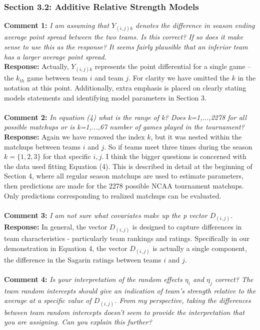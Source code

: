 \documentclass[11pt]{article} %
\begin{document}
\subsubsection*{Section 3.2: Additive Relative Strength Models}
{\bf Comment 1:} \emph{I am assuming that $Y_{(i,j)k}$ denotes the difference in season ending average point spread between the two teams. Is this correct? If so does it make sense to use this as the response? It seems fairly plausible that an inferior team has a larger average point spread.\\}
{\bf Response:} Actually, $Y_{(i,j)k}$ represents the point differential for a single game -- the $k_{th}$ game between team $i$ and team $j$. For clarity we have omitted the $k$ in the notation at this point. Additionally, extra emphasis is placed on clearly stating models statements and identifying model parameters in Section 3.\\
\\
{\bf Comment 2:} \emph{In equation (4) what is the range of k? Does k=1,...,2278 for all possible matchups or is k=1,...,67 number of games played in the tournament?\\}
{\bf Response:} Again we have removed the index $k$, but it was nested within the matchups between teams $i$ and $j$. So if teams meet three times during the season $k = \{1,2,3\}$ for that specific $i,j$. I think the bigger questions is concerned with the data used fitting Equation (4). This is described in detail at the beginning of Section 4, where all regular season matchups are used to estimate parameters, then predictions are made for the 2278 possible NCAA tournament matchups. Only predictions corresponding to realized matchups can be evaluated.\\
\\
{\bf Comment 3:} \emph{I am not sure what covariates make up the p vector $D_{(i,j)}$.\\}
{\bf Response:} In general, the vector $D_{(i,j)}$ is designed to capture differences in team characteristics - particularly team rankings and ratings. Specifically in our demonstration in Equation 4, the vector $D_{(i,j)}$ is actually a  single component, the difference in the Sagarin ratings between teams $i$ and $j$.  \\
\\
{\bf Comment 4:} \emph{Is your interpretation of the random effects $\eta_i$ and $\eta_j$ correct? The team random intercepts should give an indication of team's strength relative to the average at a specific value of $D_{(i,j)}$. From my perspective, taking the differences between team random intercepts doesn't seem to provide the interpretation that you are assigning. Can you explain this further?\\}
\end{document}
